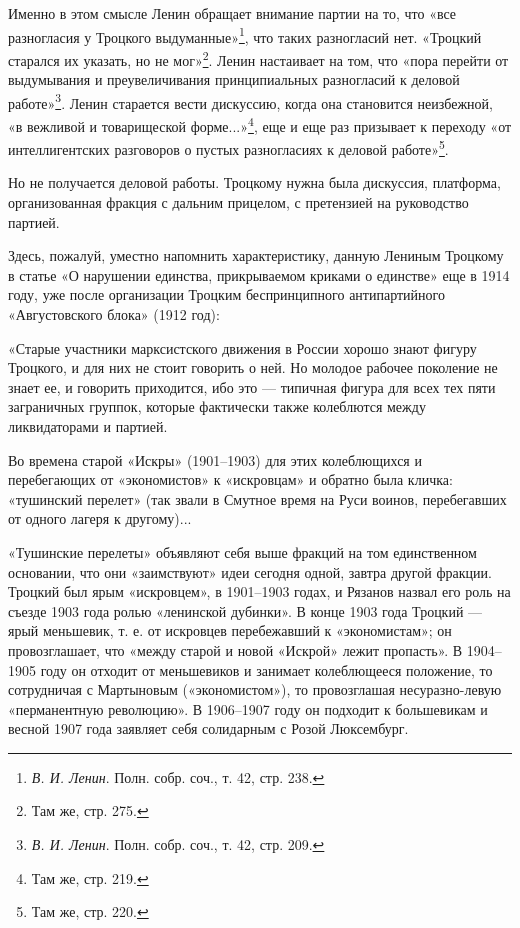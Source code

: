 \documentclass[12pt, a4paper, openany]{book}
\begin{document}
Именно в этом смысле Ленин обращает внимание партии на то, что «все разногласия у Троцкого выдуманные»\footnote{\textit{В. И. Ленин}. Полн. собр. соч., т. 42, стр. 238.}, что таких разногласий нет. «Троцкий старался их указать, но не мог»\footnote{Там же, стр. 275.}. Ленин настаивает на том, что «пора перейти от выдумывания и преувеличивания принципиальных разногласий к деловой работе»\footnote{\textit{В. И. Ленин}. Полн. собр. соч., т. 42, стр. 209.}. Ленин старается вести дискуссию, когда она становится неизбежной, «в вежливой и товарищеской форме...»\footnote{Там же, стр. 219.}, еще и еще раз призывает к переходу «от интеллигентских разговоров о пустых разногласиях к деловой работе»\footnote{Там же, стр. 220.}.

Но не получается деловой работы. Троцкому нужна была дискуссия, платформа, организованная фракция с дальним прицелом, с претензией на руководство партией.

Здесь, пожалуй, уместно напомнить характеристику, данную Лениным Троцкому в статье «О нарушении единства, прикрываемом криками о единстве» еще в 1914 году, уже после организации Троцким беспринципного антипартийного «Августовского блока» (1912 год):

«Старые участники марксистского движения в России хорошо знают фигуру Троцкого, и для них не стоит говорить о ней. Но молодое рабочее поколение не знает ее, и говорить приходится, ибо это — типичная фигура для всех тех пяти заграничных группок, которые фактически также колеблются между ликвидаторами и партией.

Во времена старой «Искры» (1901–1903) для этих колеблющихся и перебегающих от «экономистов» к «искровцам» и обратно была кличка: «тушинский перелет» (так звали в Смутное время на Руси воинов, перебегавших от одного лагеря к другому)...

«Тушинские перелеты» объявляют себя выше фракций на том единственном основании, что они «заимствуют» идеи сегодня одной, завтра другой фракции. Троцкий был ярым «искровцем», в 1901–1903 годах, и Рязанов назвал его роль на съезде 1903 года ролью «ленинской дубинки». В конце 1903 года Троцкий — ярый меньшевик, т. е. от искровцев перебежавший к «экономистам»; он провозглашает, что «между старой и новой «Искрой» лежит пропасть». В 1904–1905 году он отходит от меньшевиков и занимает колеблющееся положение, то сотрудничая с Мартыновым («экономистом»), то провозглашая несуразно-левую «перманентную революцию». В 1906–1907 году он подходит к большевикам и весной 1907 года заявляет себя солидарным с Розой Люксембург.
\end{document}
